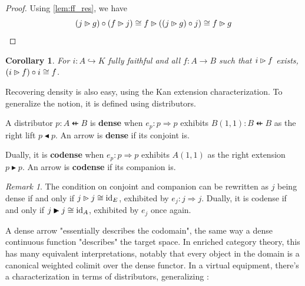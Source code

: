\documentclass[10pt,a4paper]{article}
\newcommand{\To}{\Rightarrow}
\newcommand{\dfrom}{\nvleftarrow}
\newcommand{\plext}{\mathbin{{\rhd}\mathclap{\mspace{-17.5mu}\cdot}}}
\newcommand{\prext}{\mathbin{{\blacktriangleright}\mathclap{\mspace{-10.5mu}\raisebox{-0.45pt}{\textcolor{white}{$\cdot$}}}}}
\newcommand{\rext}{\mathbin{\blacktriangleright}}
\newcommand{\rift}{\mathbin{\blacktriangleleft}}
\newcommand{\simeqq}{\cong}
\DeclareMathOperator{\id}{id}
\theoremstyle{plain}
\newtheorem{corollary}[theorem]{Corollary}
\theoremstyle{definition}
\theoremstyle{remark}
\newtheorem{remark}[theorem]{Remark}
\begin{document}
\begin{proof}
    Using \ref{lem:ff_res}, we have
    $$(j\plext g) \circ (f\plext j) \simeqq f\plext((j\plext g)\circ j)\simeqq f\plext g$$
\end{proof}

\begin{corollary}
    \label{cor:ff_plext_id}
    For $i : A \hookrightarrow K$ fully faithful and all $f : A \to B$ such that $i \plext f$ exists, $(i\plext f) \circ i \simeqq f$.
\end{corollary}

Recovering density is also easy, using the Kan extension characterization. To generalize the notion, it is defined using distributors.

\begin{definition}
    \label{def:dense}
    A distributor $p : A \dfrom B$ is \textbf{dense} when $e_p : p \To p$ exhibits $B(1, 1) : B \dfrom B$ as the right lift $p\rift p$. An arrow is \textbf{dense} if its conjoint is.

    Dually, it is \textbf{codense} when $e_p : p \To p$ exhibits $A(1, 1)$ as the right extension $p\rext p$. An arrow is \textbf{codense} if its companion is.
\end{definition}

\begin{remark}
    \label{rem:vert_co_dense}
    The condition on conjoint and companion can be rewritten as $j$ being dense if and only if $j\plext j\simeqq \id_E$, exhibited by $e_j : j \To j$. Dually, it is codense if and only if $j\prext j \simeqq \id_A$, exhibited by $e_j$ once again.
\end{remark}

A dense arrow "essentially describes the codomain", the same way a dense continuous function "describes" the target space. In enriched category theory, this has many equivalent interpretations, notably that every object in the domain is a canonical weighted colimit over the dense functor. In a virtual equipment, there's a characterization in terms of distributors, generalizing \cite[Lemma 3.20]{arkor2024formaltheoryrelativemonads}:
\end{document}

